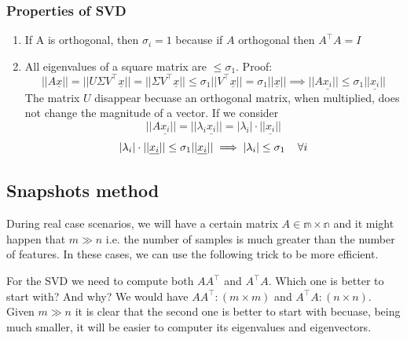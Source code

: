 \subsubsection{Properties of SVD}
\begin{enumerate}[i]
    \item If A is orthogonal, then $\sigma_i = 1$ because if $A$ orthogonal then $A^\intercal A = I$
    \item All eigenvalues of a square matrix are $\leq \sigma_1$. Proof:
    \[
        ||A\underline{x}|| = ||U\Sigma V^\intercal \underline{x}|| = ||\Sigma V^\intercal \underline{x}|| \leq \sigma_1||V^\intercal \underline{x}|| = \sigma_1||\underline{x}|| \implies ||A\underline{x_i}|| \leq \sigma_1||\underline{x_i}||
    \]
    The matrix $U$ disappear becuase an orthogonal matrix, when multiplied, does not change the magnitude of a vector. If we consider
    \[
        ||A\underline{x_i}|| = ||\lambda_i\underline{x_i}|| = |\lambda_i|\cdot ||\underline{x_i}||
    \]
    \[
        |\lambda_i|\cdot ||\underline{x_i}|| \leq \sigma_1||\underline{x_i}|| \implies |\lambda_i| \leq \sigma_1 \hspace*{0.4cm} \forall i    
    \]
\end{enumerate}

\subsection{Snapshots method}
During real case scenarios, we will have a certain matrix $A \in \mathbb{m\times n}$ and it might happen that $m \gg n$ i.e. the number of samples is much greater than the number of features. In these cases, we can use the following trick to be more efficient.

For the SVD we need to compute both $AA^\intercal$ and $A^\intercal A$. Which one is better to start with? And why?
We would have $AA^\intercal: (m\times m)$ and $A^\intercal A: (n\times n)$. Given $m \gg n$ it is clear that the second one is better to start with becuase, being much smaller, it will be easier to computer its eigenvalues and eigenvectors.    


